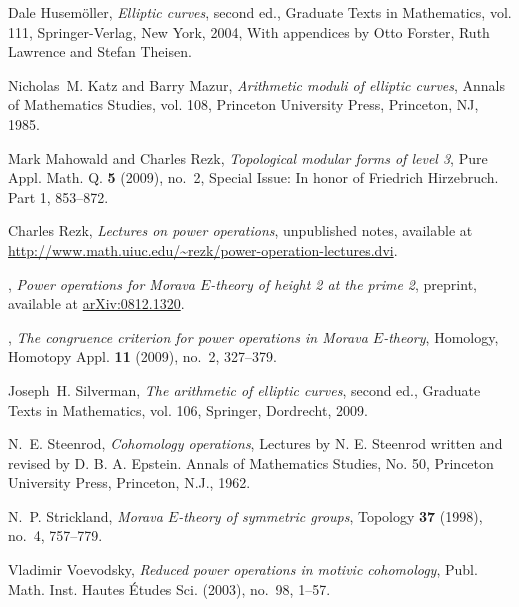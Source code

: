\documentclass{gtpart}
\theoremstyle{definition}
\theoremstyle{remark}
\begin{document}
\begin{thebibliography}
Dale Husem{\"o}ller, \emph{Elliptic curves}, second ed., Graduate Texts in
  Mathematics, vol. 111, Springer-Verlag, New York, 2004, With appendices by
  Otto Forster, Ruth Lawrence and Stefan Theisen. 

Nicholas~M. Katz and Barry Mazur, \emph{Arithmetic moduli of elliptic curves},
  Annals of Mathematics Studies, vol. 108, Princeton University Press,
  Princeton, NJ, 1985. 

Mark Mahowald and Charles Rezk, \emph{Topological modular forms of level 3},
  Pure Appl. Math. Q. \textbf{5} (2009), no.~2, Special Issue: In honor of
  Friedrich Hirzebruch. Part 1, 853--872. 

Charles Rezk, \emph{Lectures on power operations}, unpublished notes, available
  at \url{http://www.math.uiuc.edu/~rezk/power-operation-lectures.dvi}.

\bysame, \emph{Power operations for {M}orava ${E}$-theory of height 2 at the
  prime 2}, preprint, available at
  \href{http://arxiv.org/abs/0812.1320}{arXiv:0812.1320}.

\bysame, \emph{The congruence criterion for power operations in {M}orava
  {$E$}-theory}, Homology, Homotopy Appl. \textbf{11} (2009), no.~2, 327--379.

Joseph~H. Silverman, \emph{The arithmetic of elliptic curves}, second ed.,
  Graduate Texts in Mathematics, vol. 106, Springer, Dordrecht, 2009.

N.~E. Steenrod, \emph{Cohomology operations}, Lectures by N. E. Steenrod
  written and revised by D. B. A. Epstein. Annals of Mathematics Studies, No.
  50, Princeton University Press, Princeton, N.J., 1962. 

N.~P. Strickland, \emph{Morava {$E$}-theory of symmetric groups}, Topology
  \textbf{37} (1998), no.~4, 757--779. 

Vladimir Voevodsky, \emph{Reduced power operations in motivic cohomology},
  Publ. Math. Inst. Hautes \'Etudes Sci. (2003), no.~98, 1--57. 

\end{thebibliography}
\end{document}
